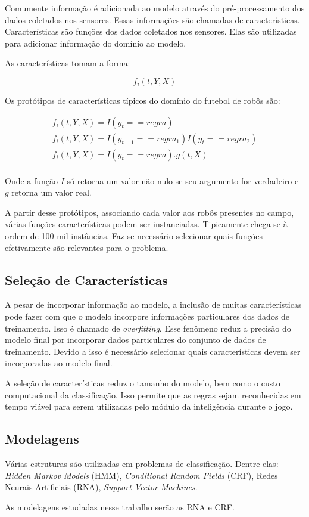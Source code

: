 Comumente informação é adicionada ao modelo através do pré-processamento dos
dados coletados nos sensores. Essas informações são chamadas de características.
Características são funções dos dados coletados nos sensores. Elas são utilizadas
para adicionar informação do domínio ao modelo.

As características tomam a forma:

\begin{centering}
\begin{equation}
f_i(t,Y,X)
\end{equation}
\end{centering}

Os protótipos de características típicos do domínio do futebol de robôs são:

\begin{centering}
\begin{eqnarray}
f_i(t,Y,X)=I(y_t == regra)\\
f_i(t,Y,X)=I(y_{t-1} == regra_1)I(y_t == regra_2)\\
f_i(t,Y,X)=I(y_t == regra).g(t,X)\\
\end{eqnarray}
\end{centering}

Onde a função $I$ só retorna um valor não nulo se seu argumento for verdadeiro e
$g$ retorna um valor real.

A partir desse protótipos, associando cada valor aos robôs presentes
no campo, várias funções características podem ser instanciadas.
Tipicamente chega-se à ordem de 100 mil instâncias. Faz-se necessário
selecionar quais funções efetivamente são relevantes para o problema.

\subsection{Seleção de Características}

A pesar de incorporar informação ao modelo, a inclusão de muitas características
pode fazer com que o modelo incorpore informações particulares dos dados de
treinamento. Isso é chamado de \textit{overfitting}. Esse fenômeno reduz a precisão
do modelo final por incorporar dados particulares do conjunto de dados de
treinamento. Devido a isso é necessário selecionar quais características devem
ser incorporadas ao modelo final.

A seleção de características reduz o tamanho do modelo, bem como o custo
computacional da classificação. Isso permite que as regras sejam reconhecidas
em tempo viável para serem utilizadas pelo módulo da inteligência durante o
jogo.

\subsection{Modelagens}

Várias estruturas são utilizadas em problemas de classificação. Dentre elas:
\textit{Hidden Markov Models} (HMM), \textit{Conditional Random Fields} (CRF),
Redes Neurais Artificiais (RNA), \textit{Support Vector Machines}.

As modelagens estudadas nesse trabalho serão as RNA e CRF.
